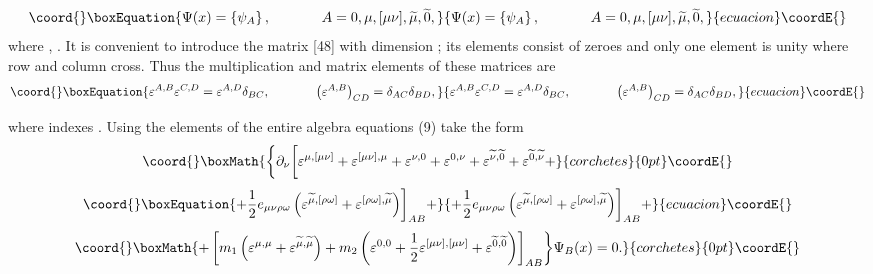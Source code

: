 \documentclass[a4paper,12pt]{article}
\begin{document}
\begin{equation}\coord{}\boxEquation{
\Psi (x)=\left\{ \psi _A\right\} ,\hspace{0.5in}A=0,\mu ,[\mu \nu
], \widetilde{\mu },\widetilde{0} , \label{10}
}{
\Psi (x)=\left\{ \psi _A\right\} ,\hspace{0.5in}A=0,\mu ,[\mu \nu
], \widetilde{\mu },\widetilde{0} , }{ecuacion}\coordE{}\end{equation}
where \myHighlight{$\psi _{\widetilde{\mu}}\equiv\widetilde{\psi}_\mu$}\coordHE{}, \coordHE{}. It is convenient to
introduce the matrix \coordHE{} [48] with dimension
\coordHE{}; its elements consist of zeroes and only one element
is unity where row \coordHE{} and column \coordHE{} cross. Thus the
multiplication and matrix elements of these matrices are
\begin{equation}\coord{}\boxEquation{
\varepsilon ^{A,B}\varepsilon ^{C,D}=\varepsilon ^{A,D}\delta
_{BC} ,\hspace{0.5in}\left( \varepsilon ^{A,B}\right) _{CD}=\delta
_{AC}\delta _{BD} ,\label{11}
}{
\varepsilon ^{A,B}\varepsilon ^{C,D}=\varepsilon ^{A,D}\delta
_{BC} ,\hspace{0.5in}\left( \varepsilon ^{A,B}\right) _{CD}=\delta
_{AC}\delta _{BD} ,}{ecuacion}\coordE{}\end{equation}

where indexes \coordHE{}. Using the elements of the entire algebra
\coordHE{} equations (9) take the form
\[\coord{}\boxMath{
\biggl \{\partial _\nu \biggl [\varepsilon ^{\mu ,[\mu \nu
]}+\varepsilon ^{[\mu \nu ],\mu }+\varepsilon ^{\nu
,0}+\varepsilon ^{0,\nu }+\varepsilon ^{ \widetilde{\nu
},\widetilde{0}}+\varepsilon ^{\widetilde{0},\widetilde{\nu } }+
}{corchetes}{0pt}\coordE{}\]
\begin{equation}\coord{}\boxEquation{
+\frac 12e_{\mu \nu \rho \omega }\left( \varepsilon
^{\widetilde{\mu },[\rho \omega ]}+\varepsilon ^{[\rho \omega
],\widetilde{\mu }}\right) \biggr ] _{AB}+  \label{12}
}{
+\frac 12e_{\mu \nu \rho \omega }\left( \varepsilon
^{\widetilde{\mu },[\rho \omega ]}+\varepsilon ^{[\rho \omega
],\widetilde{\mu }}\right) \biggr ] _{AB}+  }{ecuacion}\coordE{}\end{equation}
\[\coord{}\boxMath{
+\left[ m_1\left( \varepsilon ^{\mu ,\mu }+\varepsilon
^{\widetilde{\mu }, \widetilde{\mu }}\right) +m_2\left(
\varepsilon ^{0,0}+\frac 12\varepsilon ^{[\mu \nu ],[\mu \nu
]}+\varepsilon ^{\widetilde{0},\widetilde{0}}\right) \right]
_{AB}\biggr \}\Psi _B(x)=0 .
}{corchetes}{0pt}\coordE{}\]
\end{document}
